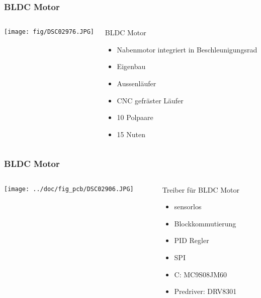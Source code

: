 \begin{frame}
    \frametitle{BLDC Motor}
    \begin{columns}
        \begin{column}{0.50\textwidth}
            \centering
            \texttt{[image: fig/DSC02976.JPG]}
        \end{column}
        \begin{column}{0.50\textwidth}
            \begin{block}{BLDC Motor}
                \begin{itemize}
                    \item Nabenmotor integriert in Beschleunigungsrad
                    \item Eigenbau
                    \item Aussenläufer
                    \item CNC gefräster Läufer
                    \item 10 Polpaare
                    \item 15 Nuten
                \end{itemize}
            \end{block}
        \end{column}
    \end{columns}
\end{frame}
\begin{frame}
    \frametitle{BLDC Motor}
    \begin{columns}
        \begin{column}{0.50\textwidth}
            \centering
            \texttt{[image: ../doc/fig\_pcb/DSC02906.JPG]}
        \end{column}
        \begin{column}{0.50\textwidth}
            \begin{block}{Treiber für BLDC Motor}
                \begin{itemize}
                    \item sensorlos
                    \item Blockkommutierung
                    \item PID Regler
                    \item SPI
                    \item \si{\micro}C: MC9S08JM60
                    \item Predriver: DRV8301
                \end{itemize}
            \end{block}
        \end{column}
    \end{columns}
\end{frame}
